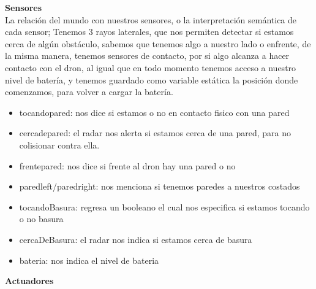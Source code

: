 \documentclass[12pt]{article}
\begin{document}
\textbf{Sensores}\\
La relación del mundo con nuestros sensores, o la interpretación semántica de cada sensor; Tenemos 3 rayos laterales, que nos permiten detectar si estamos cerca de algún obstáculo, sabemos que tenemos algo a nuestro lado o enfrente, de la misma manera, tenemos sensores de contacto, por si algo alcanza a hacer contacto con el dron, al igual que en todo momento tenemos acceso a nuestro nivel de batería, y tenemos guardado como variable estática la posición donde comenzamos, para volver a cargar la batería.

\begin{itemize}
    \item tocandopared: nos dice si estamos o no en contacto fisico con una pared
    \item cercadepared: el radar nos alerta si estamos cerca de una pared, para no colisionar contra ella.
    \item frentepared: nos dice si frente al dron hay una pared o no
    \item paredleft/paredright: nos menciona si tenemos paredes a nuestros costados
    \item tocandoBasura: regresa un booleano el cual nos especifica si estamos tocando o no basura
    \item cercaDeBasura: el radar nos indica si estamos cerca de basura
    \item bateria: nos indica el nivel de bateria
\end{itemize}
\textbf{Actuadores}\\
\end{document}
